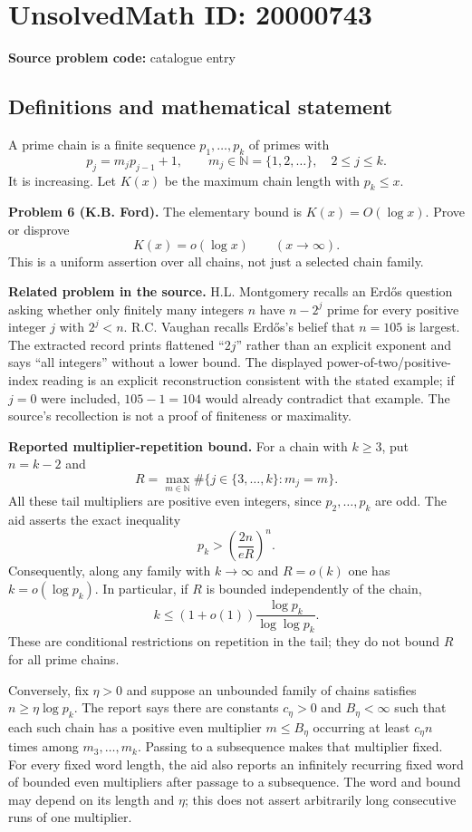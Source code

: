\documentclass[11pt]{article}
\newcommand{\N}{\mathbb{N}}
\begin{document}
\section*{UnsolvedMath ID: 20000743}
\textbf{Source problem code:} catalogue entry
\subsection{Definitions and mathematical statement}
A prime chain is a finite sequence $p_1,\ldots,p_k$ of primes with
\[
 p_j=m_jp_{j-1}+1,\qquad m_j\in\N=\{1,2,\ldots\},\quad2\leq j\leq k.
\]
It is increasing. Let $K(x)$ be the maximum chain length with $p_k\leq x$.

\textbf{Problem 6 (K.B. Ford).} The elementary bound is $K(x)=O(\log x)$. Prove or disprove
\[
 K(x)=o(\log x)\qquad(x\to\infty).
\]
This is a uniform assertion over all chains, not just a selected chain family.

\textbf{Related problem in the source.} H.L. Montgomery recalls an Erd\H{o}s question asking whether only finitely many integers $n$ have $n-2^j$ prime for every positive integer $j$ with $2^j<n$. R.C. Vaughan recalls Erd\H{o}s's belief that $n=105$ is largest. The extracted record prints flattened ``$2j$'' rather than an explicit exponent and says ``all integers'' without a lower bound. The displayed power-of-two/positive-index reading is an explicit reconstruction consistent with the stated example; if $j=0$ were included, $105-1=104$ would already contradict that example. The source's recollection is not a proof of finiteness or maximality.

\textbf{Reported multiplier-repetition bound.} For a chain with $k\geq3$, put $n=k-2$ and
\[
 R=\max_{m\in\N}\#\{j\in\{3,\ldots,k\}:m_j=m\}.
\]
All these tail multipliers are positive even integers, since $p_2,\ldots,p_k$ are odd. The aid asserts the exact inequality
\[
 p_k>\left(\frac{2n}{eR}\right)^n.
\]
Consequently, along any family with $k\to\infty$ and $R=o(k)$ one has $k=o(\log p_k)$. In particular, if $R$ is bounded independently of the chain,
\[
 k\leq(1+o(1))\frac{\log p_k}{\log\log p_k}.
\]
These are conditional restrictions on repetition in the tail; they do not bound $R$ for all prime chains.

Conversely, fix $\eta>0$ and suppose an unbounded family of chains satisfies $n\geq\eta\log p_k$. The report says there are constants $c_\eta>0$ and $B_\eta<\infty$ such that each such chain has a positive even multiplier $m\leq B_\eta$ occurring at least $c_\eta n$ times among $m_3,\ldots,m_k$. Passing to a subsequence makes that multiplier fixed. For every fixed word length, the aid also reports an infinitely recurring fixed word of bounded even multipliers after passage to a subsequence. The word and bound may depend on its length and $\eta$; this does not assert arbitrarily long consecutive runs of one multiplier.
\end{document}
